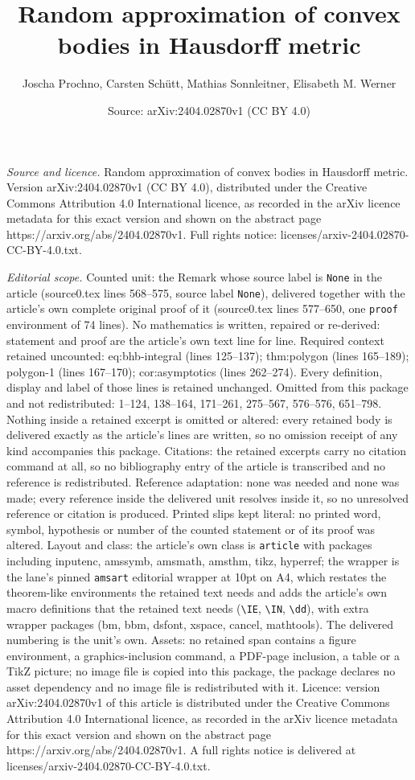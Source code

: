 \documentclass[10pt,a4paper]{amsart}
\title[Random approximation of convex bodies in Hausdorff metric]{Random approximation of convex bodies in Hausdorff metric}
\author{Joscha Prochno, Carsten Sch\"utt, Mathias Sonnleitner, Elisabeth M. Werner}
\date{Source: arXiv:2404.02870v1 (CC BY 4.0)}
\begin{document}
\maketitle

\noindent\emph{Source and licence.} Random approximation of convex bodies in Hausdorff metric. Version arXiv:2404.02870v1 (CC BY 4.0), distributed under the Creative Commons Attribution 4.0 International licence, as recorded in the arXiv licence metadata for this exact version and shown on the abstract page https://arxiv.org/abs/2404.02870v1. Full rights notice: licenses/arxiv-2404.02870-CC-BY-4.0.txt.\par\smallskip

\noindent\textit{Editorial scope.} Counted unit: the Remark whose source label is \texttt{None} in the article (source0.tex lines 568--575, source label \texttt{None}), delivered together with the article's own complete original proof of it (source0.tex lines 577--650, one \texttt{proof} environment of 74 lines). No mathematics is written, repaired or re-derived: statement and proof are the article's own text line for line. Required context retained uncounted: eq:bhb-integral (lines 125--137); thm:polygon (lines 165--189); polygon-1 (lines 167--170); cor:asymptotics (lines 262--274). Every definition, display and label of those lines is retained unchanged. Omitted from this package and not redistributed: 1--124, 138--164, 171--261, 275--567, 576--576, 651--798. Nothing inside a retained excerpt is omitted or altered: every retained body is delivered exactly as the article's lines are written, so no omission receipt of any kind accompanies this package. Citations: the retained excerpts carry no citation command at all, so no bibliography entry of the article is transcribed and no reference is redistributed. Reference adaptation: none was needed and none was made; every reference inside the delivered unit resolves inside it, so no unresolved reference or citation is produced. Printed slips kept literal: no printed word, symbol, hypothesis or number of the counted statement or of its proof was altered. Layout and class: the article's own class is \texttt{article} with packages including inputenc, amssymb, amsmath, amsthm, tikz, hyperref; the wrapper is the lane's pinned \texttt{amsart} editorial wrapper at 10pt on A4, which restates the theorem-like environments the retained text needs and adds the article's own macro definitions that the retained text needs (\texttt{\textbackslash IE}, \texttt{\textbackslash IN}, \texttt{\textbackslash dd}), with extra wrapper packages (bm, bbm, dsfont, xspace, cancel, mathtools). The delivered numbering is the unit's own. Assets: no retained span contains a figure environment, a graphics-inclusion command, a PDF-page inclusion, a table or a TikZ picture; no image file is copied into this package, the package declares no asset dependency and no image file is redistributed with it. Licence: version arXiv:2404.02870v1 of this article is distributed under the Creative Commons Attribution 4.0 International licence, as recorded in the arXiv licence metadata for this exact version and shown on the abstract page https://arxiv.org/abs/2404.02870v1. A full rights notice is delivered at licenses/arxiv-2404.02870-CC-BY-4.0.txt. 
\end{document}
